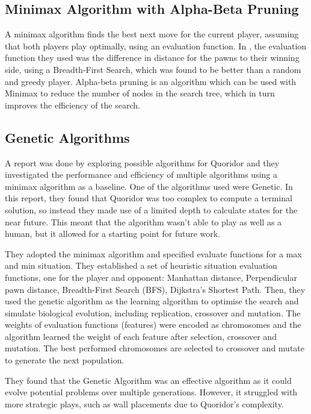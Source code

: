 \documentclass[review]{cmpreport}
\begin{document}
\subsection{Minimax Algorithm with Alpha-Beta Pruning}
A minimax algorithm finds the best next move for the current player, assuming that both players play optimally, using an evaluation function. In \cite{josequoridor}, the evaluation function they used was the difference in distance for the pawns to their winning side, using a Breadth-First Search, which was found to be better than a random and greedy player.
Alpha-beta pruning is an algorithm which can be used with Minimax to reduce the number of nodes in the search tree, which in turn improves the efficiency of the search.

\subsection{Genetic Algorithms}
A report was done by \cite{josequoridor} exploring possible algorithms for Quoridor and they investigated the performance and efficiency of multiple algorithms using a minimax algorithm as a baseline. One of the algorithms used were Genetic. In this report, they found that Quoridor was too complex to compute a terminal solution, so instead they made use of a limited depth to calculate states for the near future. This meant that the algorithm wasn't able to play as well as a human, but it allowed for a starting point for future work. 

They adopted the minimax algorithm and specified evaluate functions for a max and min situation. They established a set of heuristic situation evaluation functions, one for the player and opponent: Manhattan distance, Perpendicular pawn distance, Breadth-First Search (BFS), Dijkstra's Shortest Path. Then, they used the genetic algorithm as the learning algorithm to optimise the search and simulate biological evolution, including replication, crossover and mutation. The weights of evaluation functions (features) were encoded as chromosomes and the algorithm learned the weight of each feature after selection, crossover and mutation. The best performed chromosomes are selected to crossover and mutate to generate the next population.

\noindent They found that the Genetic Algorithm was an effective algorithm as it could evolve potential problems over multiple generations. However, it struggled with more strategic plays, such as wall placements due to Quoridor's complexity.
\end{document}
